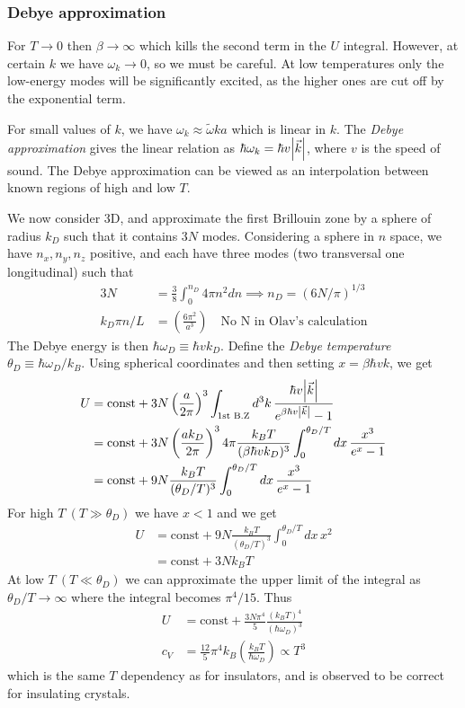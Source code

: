 \documentclass[a4paper, english, 12pt]{article}
\newcommand{\closed}[1]{\left( #1 \right)}
\begin{document}
\begin{multicols*}{2}
\subsubsection*{Debye approximation}
For $T\to0$ then $\beta\to\infty$ which kills the second term in the $U$ integral. However, at certain $k$ we have $\omega_k\to0$, so we must be careful. At low temperatures only the low-energy modes will be significantly excited, as the higher ones are cut off by the exponential term.  

For small values of $k$, we have $\omega_k\approx \tilde{\omega} ka$ which is linear in $k$. The \textit{Debye approximation} gives the linear relation as $\hbar\omega_k=\hbar v \abs{\vec{k}}$, where $v$ is the speed of sound. The Debye approximation can be viewed as an interpolation between known regions of high and low $T$. 

We now consider 3D, and approximate the first Brillouin zone by a sphere of radius $k_D$ such that it contains $3N$ modes. Considering a sphere in $n$ space, we have $n_x,n_y,n_z$ positive, and each have three modes (two transversal one longitudinal) such that 
\begin{align*}
    3N&=\frac{3}{8}\int_0^{n_D} 4\pi n^2 dn \implies n_D = (6N/\pi)^{1/3} \\ 
    k_D \pi n/L &= \closed{\frac{6\pi^2}{a^3}}\quad \text{No N in Olav's calculation}
\end{align*}
The Debye energy is then $\hbar \omega_D\equiv \hbar v k_D$. Define the \textit{Debye temperature} $\theta_D\equiv \hbar \omega_D/k_B$. Using spherical coordinates and then setting $x=\beta\hbar v k$, we get 
\begin{align*}
    U &= \text{const} + 3N\closed{\frac{a}{2\pi}}^3 \int_{\text{1st B.Z}} d^3 k\,\frac{\hbar v \abs{\vec{k}}}{e^{\beta\hbar v \abs{\vec{k}}} - 1} \\ 
    &= \text{const} + 3N\closed{\frac{a k_D}{2\pi}}^3 4\pi \frac{k_B T}{(\beta\hbar vk_D)^3} \int_0^{\theta_D / T} dx\, \frac{x^3}{e^x - 1} \\ 
    &= \text{const} + 9N \frac{k_B T}{(\theta_D / T)^3} \int_0^{\theta_D / T} dx\, \frac{x^3}{e^x - 1}
\end{align*}
For high $T\:(T\gg\theta_D)$ we have $x<1$ and we get 
\begin{align*}
    U &= \text{const} + 9N \frac{k_B T}{(\theta_D / T)^3} \int_0^{\theta_D / T} dx\, x^2 \\
    &= \text{const} + 3N k_B T
\end{align*}
At low $T\:(T\ll\theta_D)$ we can approximate the upper limit of the integral as $\theta_D/T\to\infty$ where the integral becomes $\pi^4/15$. Thus 
\begin{align*}
    U &= \text{const} + \frac{3N\pi^4}{5} \frac{(k_B T)^4}{(\hbar\omega_D)^3} \\ 
    c_V &= \frac{12}{5}\pi^4 k_B \closed{\frac{k_B T}{\hbar\omega_D}} \propto T^3 
\end{align*}
which is the same $T$ dependency as for insulators, and is observed to be correct for insulating crystals. 


\end{multicols*}
\end{document}
